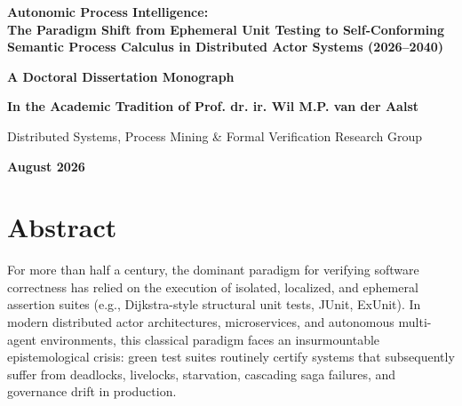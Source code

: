 \documentclass[11pt,a4paper,oneside]{book}
\theoremstyle{definition}
\begin{document}
\begin{titlepage}
    \centering
    \vspace*{1.5cm}
    
    {\huge\bfseries Autonomic Process Intelligence:\\[0.4cm] 
    The Paradigm Shift from Ephemeral Unit Testing to Self-Conforming Semantic Process Calculus in Distributed Actor Systems (2026--2040)\par}
    
    \vspace{1.5cm}
    
    {\Large\bfseries A Doctoral Dissertation Monograph\par}
    
    \vspace{1.5cm}
    
    {\large\bfseries In the Academic Tradition of Prof. dr. ir. Wil M.P. van der Aalst\par}
    \vspace{0.3cm}
    {\large Distributed Systems, Process Mining \& Formal Verification Research Group\par}
    
    \vfill
    
    {\large\bfseries August 2026\par}
\end{titlepage}

\chapter*{Abstract}

For more than half a century, the dominant paradigm for verifying software correctness has relied on the execution of isolated, localized, and ephemeral assertion suites (e.g., Dijkstra-style structural unit tests, JUnit, ExUnit). In modern distributed actor architectures, microservices, and autonomous multi-agent environments, this classical paradigm faces an insurmountable epistemological crisis: green test suites routinely certify systems that subsequently suffer from deadlocks, livelocks, starvation, cascading saga failures, and governance drift in production.
\end{document}

